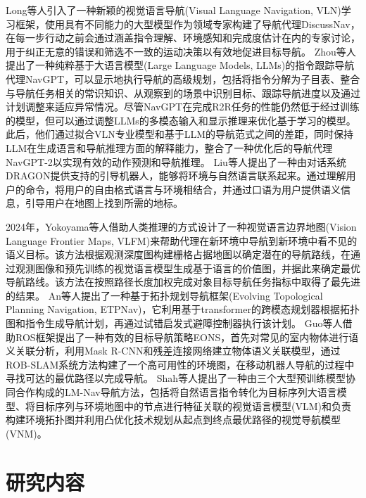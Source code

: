 	
	Long\cite{long2024discuss}等人引入了一种新颖的视觉语言导航(Visual Language Navigation, VLN)学习框架，使用具有不同能力的大型模型作为领域专家构建了导航代理DiscussNav，在每一步行动之前会通过涵盖指令理解、环境感知和完成度估计在内的专家讨论，用于纠正无意的错误和筛选不一致的运动决策以有效地促进目标导航。
	Zhou\cite{zhou2024navgpt1}等人提出了一种纯粹基于大语言模型(Large Language Models, LLMs)的指令跟踪导航代理NavGPT，可以显示地执行导航的高级规划，包括将指令分解为子目表、整合与导航任务相关的常识知识、从观察到的场景中识别目标、跟踪导航进度以及通过计划调整来适应异常情况。尽管NavGPT在完成R2R任务的性能仍然低于经过训练的模型，但可以通过调整LLMs的多模态输入和显示推理来优化基于学习的模型。此后，他们通过拟合VLN专业模型和基于LLM的导航范式之间的差距，同时保持LLM在生成语言和导航推理方面的解释能力，整合了一种优化后的导航代理NavGPT-2\cite{zhou2024navgpt2}以实现有效的动作预测和导航推理。
	Liu\cite{liu2024dragon}等人提出了一种由对话系统DRAGON提供支持的引导机器人，能够将环境与自然语言联系起来。通过理解用户的命令，将用户的自由格式语言与环境相结合，并通过口语为用户提供语义信息，引导用户在地图上找到所需的地标。

	

    
	2024年，Yokoyama\cite{yokoyama2024vlfm}等人借助人类推理的方式设计了一种视觉语言边界地图(Vision Language Frontier Maps, VLFM)来帮助代理在新环境中导航到新环境中看不见的语义目标。该方法根据观测深度图构建栅格占据地图以确定潜在的导航路线，在通过观测图像和预先训练的视觉语言模型生成基于语言的价值图，并据此来确定最优导航路线。该方法在按照路径长度加权完成对象目标导航任务指标中取得了最先进的结果。
	An\cite{an2024etpnav}等人提出了一种基于拓扑规划导航框架(Evolving Topological Planning Navigation, ETPNav)，它利用基于transformer的跨模态规划器根据拓扑图和指令生成导航计划，再通过试错启发式避障控制器执行该计划。
	Guo\cite{electronics11071136}等人借助ROS框架提出了一种有效的目标导航策略EONS，首先对常见的室内物体进行语义关联分析，利用Mask R-CNN和残差连接网络建立物体语义关联模型，通过ROB-SLAM系统方法构建了一个高可用性的环境图，在移动机器人导航的过程中寻找可达的最优路径以完成导航。
    Shah\cite{shah2021ving, shah2023lm}等人提出了一种由三个大型预训练模型协同合作构成的LM-Nav导航方法，包括将自然语言指令转化为目标序列大语言模型、将目标序列与环境地图中的节点进行特征关联的视觉语言模型(VLM)和负责构建环境拓扑图并利用凸优化技术规划从起点到终点最优路径的视觉导航模型(VNM)。



\section{研究内容}

